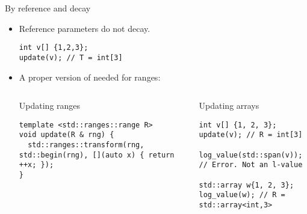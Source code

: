 \begin{frame}[t,fragile]{By reference and decay}
\begin{itemize}
  \item Reference parameters do not decay.
\begin{lstlisting}
int v[] {1,2,3};
update(v); // T = int[3]
\end{lstlisting}

  \item A proper version of  needed for ranges:

\begin{columns}[T]

\begin{block}{Updating ranges}
\begin{lstlisting}
template <std::ranges::range R>
void update(R & rng) {
  std::ranges::transform(rng, std::begin(rng), [](auto x) { return ++x; });
}
\end{lstlisting}
\end{block}

\begin{block}{Updating arrays}
\begin{lstlisting}
int v[] {1, 2, 3};
update(v); // R = int[3]

log_value(std::span(v)); // Error. Not an l-value

std::array w{1, 2, 3};
log_value(w); // R = std::array<int,3>
\end{lstlisting}
\end{block}

\end{columns}
\end{itemize}
\end{frame}

